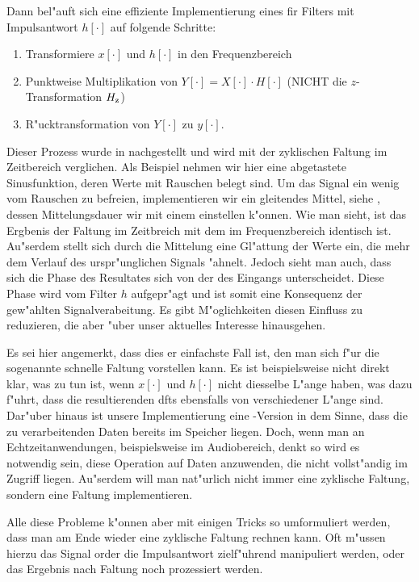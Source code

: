 Dann bel"auft sich eine effiziente Implementierung eines \gls{fir} Filters mit Impulsantwort $h[\cdot]$ auf folgende Schritte:
\begin{enumerate}
    \item Transformiere $x[\cdot]$ und $h[\cdot]$ in den Frequenzbereich
    \item Punktweise Multiplikation von $Y[\cdot] = X[\cdot] \cdot H[\cdot]$ (NICHT die $z$-Transformation $H_{{\rm z}}$)
    \item R"ucktransformation von $Y[\cdot]$ zu $y[\cdot]$.
\end{enumerate}
%
Dieser Prozess wurde in  nachgestellt und wird mit der zyklischen Faltung im Zeitbereich verglichen.
Als Beispiel nehmen wir hier eine abgetastete Sinusfunktion, deren Werte mit Rauschen belegt sind.
Um das Signal ein wenig vom Rauschen zu befreien, implementieren wir ein gleitendes Mittel, siehe , dessen Mittelungsdauer wir mit einem  einstellen k"onnen.
Wie man sieht, ist das Ergbenis der Faltung im Zeitbreich mit dem im Frequenzbereich identisch ist.
Au"serdem stellt sich durch die Mittelung eine Gl"attung der Werte ein, die mehr dem Verlauf des urspr"unglichen Signals "ahnelt.
Jedoch sieht man auch, dass sich die Phase des Resultates sich von der des Eingangs unterscheidet.
Diese Phase wird vom Filter $h$ aufgepr"agt und ist somit eine Konsequenz der gew"ahlten Signalverabeitung.
Es gibt M"oglichkeiten diesen Einfluss zu reduzieren, die aber "uber unser aktuelles Interesse hinausgehen.

Es sei hier angemerkt, dass dies er einfachste Fall ist, den man sich f"ur die sogenannte schnelle Faltung vorstellen kann.
Es ist beispielsweise nicht direkt klar, was zu tun ist, wenn $x[\cdot]$ und $h[\cdot]$ nicht diesselbe L"ange haben, was dazu f"uhrt, dass die resultierenden \glspl{dft} ebensfalls von verschiedener L"ange sind.
Dar"uber hinaus ist unsere Implementierung eine -Version in dem Sinne, dass die zu verarbeitenden Daten bereits im Speicher liegen.
Doch, wenn man an Echtzeitanwendungen, beispielsweise im Audiobereich, denkt so wird es notwendig sein, diese Operation auf Daten anzuwenden, die nicht vollst"andig im Zugriff liegen.
Au"serdem will man nat"urlich nicht immer eine zyklische Faltung, sondern eine  Faltung implementieren.

Alle diese Probleme k"onnen aber mit einigen Tricks so umformuliert werden, dass man am Ende wieder eine zyklische Faltung rechnen kann.
Oft m"ussen hierzu das Signal order die Impulsantwort zielf"uhrend manipuliert werden, oder das Ergebnis nach Faltung noch prozessiert werden.

